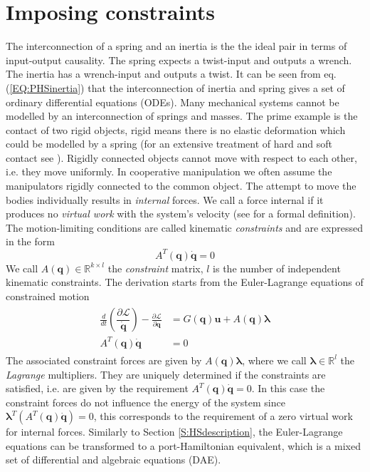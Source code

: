 \documentclass[a4paper,twoside, openright,12pt]{report}
\newcommand{\f}[1]{\boldsymbol{#1}}
\begin{document}
{\section{Imposing constraints}\label{S:ImposingConstraints}
The interconnection of a spring and an inertia is the the ideal pair in terms of input-output causality. The spring expects a twist-input and outputs a wrench. The inertia has a wrench-input and outputs a twist. It can be seen from eq. (\ref{EQ:PHSinertia}) that the interconnection of inertia and spring gives a set of ordinary differential equations (ODEs). Many mechanical systems cannot be modelled by an interconnection of springs and masses. The prime example is the contact of two rigid objects, rigid means there is no elastic deformation which could be modelled by a spring (for an extensive treatment of hard and soft contact see \cite{Duindam_09}). Rigidly connected objects cannot move with respect to each other, i.e. they move uniformly. In cooperative manipulation we often assume the manipulators rigidly connected to the common object. The attempt to  move the bodies individually results in \emph{internal} forces. We call a force internal if it produces no \emph{virtual work} with the system's velocity (see \cite{Erhart_16} for a formal definition). The motion-limiting conditions are called kinematic \emph{constraints} and are expressed in the form
\begin{equation}
A^T(\f{q})\dot{\f{q}}=0
\end{equation}
We call $A(\f{q}) \in \mathbb{R}^{k \times l}$ the \emph{constraint} matrix, $l$ is the number of independent kinematic constraints. The derivation starts from the Euler-Lagrange equations of constrained motion \cite{duindam2009geoplexbook}
\begin{eqnarray}
\begin{aligned}
\frac{d}{dt}\left(\dfrac{\partial \mathcal{L}}{\dot{\f{q}}}\right) - \frac{\partial \mathcal{L}}{\partial \f{q}} &= G(\f{q})\f{u} + A(\f{q})\boldsymbol{\lambda}
\\
A^T(\f{q})\dot{\f{q}} &= 0
\end{aligned}
\end{eqnarray}
The associated constraint forces are given by $A(\f{q})\boldsymbol{\lambda}$, where we call $\boldsymbol{\lambda} \in  \mathbb{R}^l$ the \emph{Lagrange} multipliers. They are uniquely determined if the constraints are satisfied, i.e. are given by the requirement $A^T(\f{q})\dot{\f{q}}=0$. In this case the constraint forces do not influence the energy of the system since $\boldsymbol{\lambda}^T (A^T(\f{q})\dot{\f{q}}) = 0$, this corresponds to the requirement of a zero virtual work for internal forces. Similarly to Section \ref{S:HSdescription}, the Euler-Lagrange equations can be transformed to a port-Hamiltonian equivalent, which is a mixed set of differential and algebraic equations (DAE).
}
\end{document}
